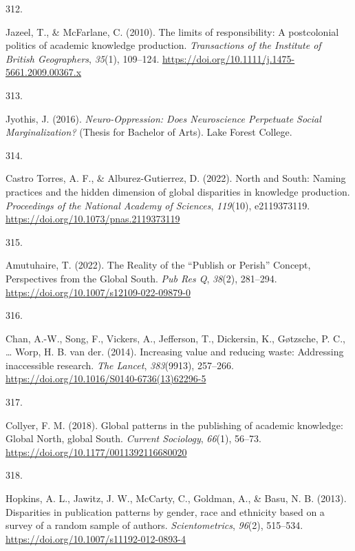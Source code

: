 \documentclass[
  11pt,
  letterpaper,
]{scrreprt}
\newlength{\cslhangindent}
\newlength{\csllabelwidth}
\newenvironment{CSLReferences}[2] %
 {\begin{list}{}{%
  \setlength{\itemindent}{0pt}
  \setlength{\leftmargin}{0pt}
  \setlength{\parsep}{0pt}
  \ifodd #1
   \setlength{\leftmargin}{\cslhangindent}
   \setlength{\itemindent}{-1\cslhangindent}
  \fi
  \setlength{\itemsep}{#2\baselineskip}}}
 {\end{list}}
\newcommand{\CSLLeftMargin}[1]{\parbox[t]{\csllabelwidth}{\strut#1\strut}}
\newcommand{\CSLRightInline}[1]{\parbox[t]{\linewidth - \csllabelwidth}{\strut#1\strut}}
\begin{document}
\begin{CSLReferences}{0}{0}
\CSLLeftMargin{312. }%
\CSLRightInline{Jazeel, T., \& McFarlane, C. (2010). The limits of
responsibility: A postcolonial politics of academic knowledge
production. \emph{Transactions of the Institute of British Geographers},
\emph{35}(1), 109--124.
\url{https://doi.org/10.1111/j.1475-5661.2009.00367.x}}

\CSLLeftMargin{313. }%
\CSLRightInline{Jyothis, J. (2016). \emph{Neuro-{Oppression}: {Does
Neuroscience Perpetuate Social Marginalization}?} (Thesis for Bachelor
of Arts). Lake Forest College.}

\CSLLeftMargin{314. }%
\CSLRightInline{Castro Torres, A. F., \& Alburez-Gutierrez, D. (2022).
North and {South}: {Naming} practices and the hidden dimension of global
disparities in knowledge production. \emph{Proceedings of the National
Academy of Sciences}, \emph{119}(10), e2119373119.
\url{https://doi.org/10.1073/pnas.2119373119}}

\CSLLeftMargin{315. }%
\CSLRightInline{Amutuhaire, T. (2022). The {Reality} of the {``{Publish}
or {Perish}''} {Concept}, {Perspectives} from the {Global South}.
\emph{Pub Res Q}, \emph{38}(2), 281--294.
\url{https://doi.org/10.1007/s12109-022-09879-0}}

\CSLLeftMargin{316. }%
\CSLRightInline{Chan, A.-W., Song, F., Vickers, A., Jefferson, T.,
Dickersin, K., Gøtzsche, P. C., \ldots{} Worp, H. B. van der. (2014).
Increasing value and reducing waste: Addressing inaccessible research.
\emph{The Lancet}, \emph{383}(9913), 257--266.
\url{https://doi.org/10.1016/S0140-6736(13)62296-5}}

\CSLLeftMargin{317. }%
\CSLRightInline{Collyer, F. M. (2018). Global patterns in the publishing
of academic knowledge: {Global North}, global {South}. \emph{Current
Sociology}, \emph{66}(1), 56--73.
\url{https://doi.org/10.1177/0011392116680020}}

\CSLLeftMargin{318. }%
\CSLRightInline{Hopkins, A. L., Jawitz, J. W., McCarty, C., Goldman, A.,
\& Basu, N. B. (2013). Disparities in publication patterns by gender,
race and ethnicity based on a survey of a random sample of authors.
\emph{Scientometrics}, \emph{96}(2), 515--534.
\url{https://doi.org/10.1007/s11192-012-0893-4}}


\end{CSLReferences}
\end{document}
